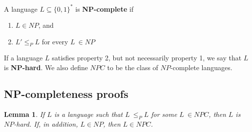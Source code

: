 \documentclass[12pt]{article}
\newtheorem{lemma}[theorem]{Lemma}
\begin{document}
A language $L \subseteq \{ 0,1 \}^*$ is \textbf{NP-complete} if
\begin{enumerate}
  \item $L \in NP$, and
  \item $L' \le_P L$ for every $L\ \in NP$
\end{enumerate}

If a language $L$ satisfies property 2, but not necessarily property 1, we say that $L$ is \textbf{NP-hard}. We also define $NPC$ to be the class of $NP$-complete languages.

\subsection{NP-completeness proofs}

\begin{lemma}
If $L$ is a language such that $L\ \le_P L$ for some $L\ \in NPC$, then $L$ is $NP$-hard. If, in addition, $L \in NP$, then $L \in NPC$.
\end{lemma}
\end{document}
